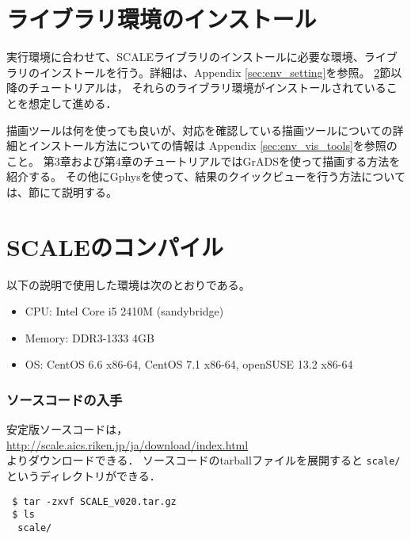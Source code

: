 \section{ライブラリ環境のインストール}
\label{sec:inst_env}
実行環境に合わせて、SCALEライブラリのインストールに必要な環境、ライブラリのインストールを行う。詳細は、Appendix \ref{sec:env_setting}を参照。
\ref{sec:source_code}節以降のチュートリアルは，
それらのライブラリ環境がインストールされていることを想定して進める．

描画ツールは何を使っても良いが、対応を確認している描画ツールについての詳細とインストール方法についての情報は
Appendix \ref{sec:env_vis_tools}を参照のこと。
第3章および第4章のチュートリアルではGrADSを使って描画する方法を紹介する。
その他にGphysを使って、結果のクイックビューを行う方法については、\label{sec:quicklook}節にて説明する。



\section{SCALEのコンパイル} \label{sec:source_code}


以下の説明で使用した環境は次のとおりである。
\begin{itemize}
\item CPU: Intel Core i5 2410M (sandybridge)
\item Memory: DDR3-1333 4GB
\item OS: CentOS 6.6 x86-64, CentOS 7.1 x86-64, openSUSE 13.2 x86-64
\end{itemize}

\subsubsection{ソースコードの入手}
安定版ソースコードは，\\
 \url{http://scale.aics.riken.jp/ja/download/index.html}\\
よりダウンロードできる．
ソースコードのtarballファイルを展開すると
\verb|scale/|というディレクトリができる．
\begin{verbatim}
 $ tar -zxvf SCALE_v020.tar.gz
 $ ls
  scale/
\end{verbatim}



